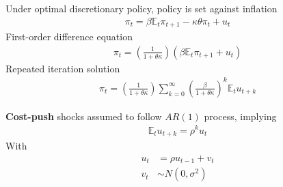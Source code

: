 \documentclass{beamer}
\begin{document}
\begin{frame}
 Under optimal discretionary policy, policy is set against inflation
\begin{align}
  \pi_t=\beta \mathbb{E}_t\pi_{t+1}-\kappa\theta\pi_t+u_t
\end{align}
\medskip
First-order difference equation
\begin{align}
  \pi_t=\left(\frac{1}{1+\theta\kappa}\right) (\beta \mathbb{E}_t\pi_{t+1} + u_t)
\end{align}
\medskip
Repeated iteration solution
\begin{align}
  \pi_t = \left(\frac{1}{1+\theta\kappa}\right) \sum_{k=0}^{\infty} \left(\frac{\beta}{1+\theta\kappa}\right)^k \mathbb{E}_tu_{t+k}
\end{align}
\end{frame}

\begin{frame}
  \textbf{Cost-push} shocks assumed to follow $AR(1)$ process, implying
  \begin{align}
    \mathbb{E}_tu_{t+k}=\rho^ku_t
  \end{align}
  \medskip
  With 
  \begin{align}
 u_t&=\rho u_{t-1} + v_t \\ \nonumber v_t &\sim N(0,\sigma^2) 
\end{align}
\end{frame}
\end{document}
